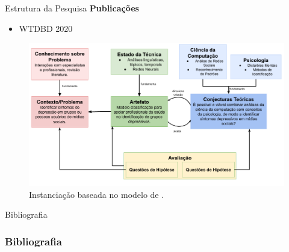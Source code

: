\documentclass[aspectratio=169,10pt,xcolor={dvipsnames}]{beamer}
\begin{document}

\begin{frame}{Estrutura da Pesquisa}
  \textbf{\large Publicações}
  \begin{block}{}
    \begin{itemize}
      \item WTDBD 2020
    \end{itemize}
  \end{block}
\end{frame}


\begin{frame}
  \begin{figure}
    \centering
    \includegraphics[scale=.4]{Graphics/Instancia DSR.png}
    \caption{Instanciação baseada no modelo de \cite{Pimentel2020}.}
  \end{figure}
\end{frame}

  


\begin{frame}{Bibliografia}
  \frametitle{Bibliografia}
  
  
  
\end{frame}
\end{document}
